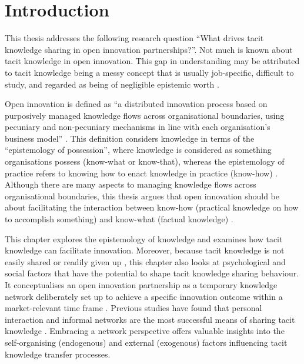 \section{Introduction}

This thesis addresses the following research question \enquote{What drives tacit knowledge sharing in open innovation partnerships?}. Not much is known about tacit knowledge in open innovation. This gap in understanding may be attributed to tacit knowledge being a messy concept that is usually job-specific, difficult to study, and regarded as being of negligible epistemic worth \citep{mohajan2016sharing}. \medskip

Open innovation is defined as \enquote{a distributed innovation process based on purposively managed knowledge flows across organisational boundaries, using pecuniary and non-pecuniary mechanisms in line with each organisation’s business model} \citep[][pg.~17]{chesbrough2014explicating}. This definition considers knowledge in terms of the \enquote{epistemology of possession}, where knowledge is considered as something organisations possess (know-what or know-that), whereas the epistemology of practice refers to knowing how to enact knowledge in practice (know-how) \citep{cook1999bridging}. Although there are many aspects to managing knowledge flows across organisational boundaries, this thesis argues that open innovation should be about facilitating the interaction between know-how (practical knowledge on how to accomplish something) and know-what (factual knowledge) \citep{winter1987knowledge, brown1991organizational, brown2001knowledge, garud1997distinction}.  \medskip

This chapter explores the epistemology of knowledge and examines how tacit knowledge can facilitate innovation. Moreover, because tacit knowledge is not easily shared or readily given up \citep{von1994sticky, szulanski2003sticky, seidler2008use}, this chapter also looks at psychological and social factors that have the potential to shape tacit knowledge sharing behaviour. It conceptualises an open innovation partnership as a temporary knowledge network deliberately set up to achieve a specific innovation outcome within a market-relevant time frame \citep{cococcioni2014exploring,terhorst2018tacit}. Previous studies have found that personal interaction and informal networks are the most successful means of sharing tacit knowledge \citep{holste2010trust,mohajan2016sharing,khatun2018sharing}. Embracing a network perspective offers valuable insights into the self-organising (endogenous) and external (exogenous) factors influencing tacit knowledge transfer processes. \medskip

